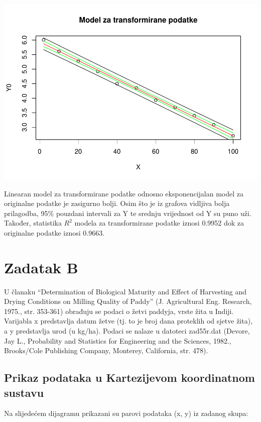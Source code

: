 \documentclass[]{article}
\begin{document}
\includegraphics{Izvjestaj_files/figure-latex/unnamed-chunk-15-2.pdf}

Linearan model za transformirane podatke odnosno eksponencijalan model
za originalne podatke je zasigurno bolji. Osim što je iz grafova
vidljiva bolja prilagodba, 95\% pouzdani intervali za Y te srednju
vrijednost od Y su puno uži. Također, statistika \(R^2\) modela za
transformirane podatke iznosi 0.9952 dok za originalne podatke iznosi
0.9663.

\section{Zadatak B}\label{zadatak-b}

U članaku ``Determination of Biological Maturity and Effect of
Harvesting and Drying Conditions on Milling Quality of Paddy'' (J.
Agricultural Eng. Research, 1975., str. 353-361) obrađuju se podaci o
žetvi paddyja, vrste žita u Indiji. Varijabla x predstavlja datum žetve
(tj. to je broj dana proteklih od sjetve žita), a y predstavlja urod (u
kg/ha). Podaci se nalaze u datoteci zad55r.dat (Devore, Jay L.,
Probability and Statistics for Engineering and the Sciences, 1982.,
Brooks/Cole Publishing Company, Monterey, California, str. 478).

\subsection{Prikaz podataka u Kartezijevom koordinatnom
sustavu}\label{prikaz-podataka-u-kartezijevom-koordinatnom-sustavu-1}

Na slijedećem dijagramu prikazani su parovi podataka (x, y) iz zadanog
skupa:
\end{document}
